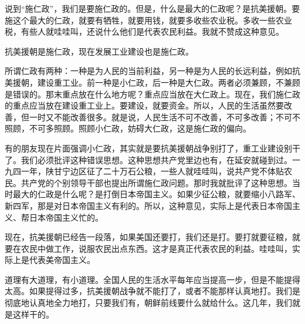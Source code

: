 说到“施仁政”，我们是要施仁政的。但是，什么是最大的仁政呢？是抗美援朝。要施这个最大的仁政，就要有牺牲，就要用钱，就要多收些农业税。多收一些农业税，有些人就哇哇叫，还说什么他们是代表农民利益。我就不赞成这种意见。

抗美援朝是施仁政，现在发展工业建设也是施仁政。

所谓仁政有两种：一种是为人民的当前利益，另一种是为人民的长远利益，例如抗美援朝，建设重工业。前一种是小仁政，后一种是大仁政。两者必须兼顾，不兼顾是错误的。那末重点放在什么地方呢？重点应当放在大仁政上。现在，我们施仁政的重点应当放在建设重工业上。要建设，就要资金。所以，人民的生活虽然要改善，但一时又不能改善很多。就是说，人民生活不可不改善，不可多改善；不可不照顾，不可多照顾。照顾小仁政，妨碍大仁政，这是施仁政的偏向。

有的朋友现在片面强调小仁政，其实就是要抗美援朝战争别打了，重工业建设别干了。我们必须批评这种错误思想。这种思想共产党里边也有，在延安就碰到过。一九四一年，陕甘宁边区征了二十万石公粮，一些人就哇哇叫，说共产党不体贴农民。共产党的个别领导干部也提出所谓施仁政问题。那时我就批评了这种思想。当时最大的仁政是什么呢？是打倒日本帝国主义。如果少征公粮，就要缩小八路军、新四军，那是对日本帝国主义有利的。所以，这种意见，实际上是代表日本帝国主义、帮日本帝国主义忙的。

现在，抗美援朝已经告一段落，如果美国还要打，我们还是打。要打就要征粮，就要在农民中做工作，说服农民出点东西。这才是真正代表农民的利益。哇哇叫，实际上是代表美帝国主义。

道理有大道理，有小道理。全国人民的生活水平每年应当提高一步，但是不能提得太高。如果提得过多，抗美援朝战争就不能打了，或者不能那样认真地打。我们是彻底地认真地全力地打，只要我们有，朝鲜前线要什么就给什么。这几年，我们就是这样干的。
